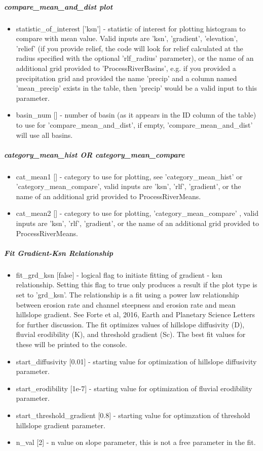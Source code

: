 \subparagraph{compare\_mean\_and\_dist plot}
\begin{itemize}
\item statistic\_of\_interest ['ksn'] - statistic of interest for plotting histogram to compare with mean value. Valid inputs are 'ksn', 'gradient',
'elevation', 'relief' (if you provide relief, the code will look for relief calculated at the radius specified with the optional 'rlf\_radius' parameter),
or the name of an additional grid provided to 'ProcessRiverBasins', e.g. if you provided a precipitation grid and provided the name 'precip'
and a column named 'mean\_precip' exists in the table, then 'precip' would be a valid input to this parameter.
\item basin\_num [] - number of basin (as it appears in the ID column of the table) to use for 'compare\_mean\_and\_dist', if empty, 'compare\_mean\_and\_dist'
will use all basins.
\end{itemize}

\subparagraph{category\_mean\_hist OR category\_mean\_compare}
\begin{itemize}
\item cat\_mean1 [] - category to use for plotting, see 'category\_mean\_hist' or 'category\_mean\_compare', valid inputs are 'ksn', 'rlf', 'gradient', or 
the name of an additional grid provided to ProcessRiverMeans.
\item cat\_mean2 [] - category to use for plotting, 'category\_mean\_compare' , valid inputs are 'ksn', 'rlf', 'gradient', or the name of an additional grid 
provided to ProcessRiverMeans.
\end{itemize}

\subparagraph{Fit Gradient-Ksn Relationship}
\begin{itemize}
\item fit\_grd\_ksn [false] - logical flag to initiate fitting of gradient - ksn relationship. Setting this flag to true only produces a result if the 
plot type is set to 'grd\_ksn'. The relationship is a fit using a power law relationship between erosion rate and channel steepness and erosion
rate and mean hillslope gradient. See Forte et al, 2016, Earth and Planetary Science Letters for further discussion. The fit optimizes
values of hillslope diffusivity (D), fluvial erodibility (K), and threshold gradient (Sc). The best fit values for these will be printed
to the console.
\item start\_diffusivity [0.01] - starting value for optimization of hillslope diffusivity parameter.
\item start\_erodibility [1e-7] - starting value for optimization of fluvial erodibility parameter.
\item start\_threshold\_gradient [0.8] - starting value for optimzation of threshold hillslope gradient parameter.
\item n\_val [2] - n value on slope parameter, this is not a free parameter in the fit.
\end{itemize}

